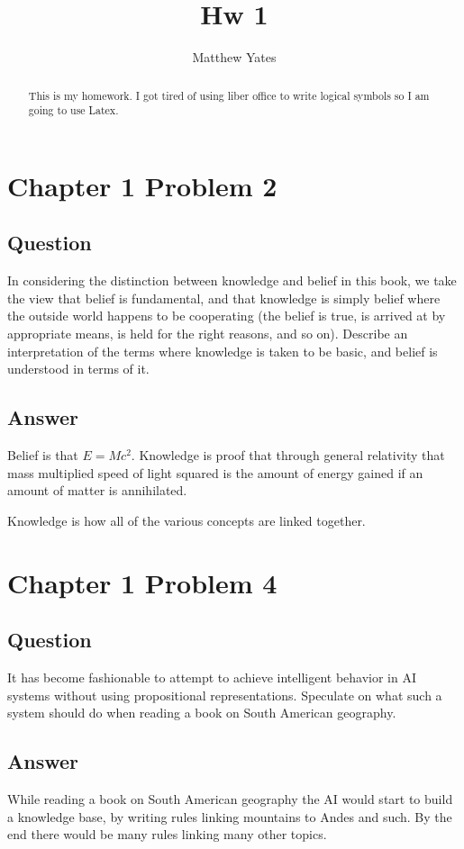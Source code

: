 \documentclass[10pt]{article}
\title{Hw 1}
\author{Matthew Yates}
\begin{document}
\maketitle

\begin{abstract}
	This is my homework. I got tired of using liber office 
	to write logical symbols so I am going to use Latex.
\end{abstract}

\section{Chapter 1 Problem 2}
\subsection{Question}
In considering the distinction between knowledge and belief in this book,
we take the view that belief is fundamental, and that knowledge is simply
belief where the outside world happens to be cooperating (the belief is true,
is arrived at by appropriate means, is held for the right reasons, and so on).
Describe an interpretation of the terms where knowledge is taken to be basic,
and belief is understood in terms of it.

\subsection{Answer}
Belief is that $E=Mc^{2}$. Knowledge is proof that through
general relativity that mass multiplied speed of light 
squared is the amount of energy gained if an amount
of matter is annihilated. 

Knowledge is how all of the various concepts are linked together.

\section{Chapter 1 Problem 4}
\subsection{Question}
It has become fashionable to attempt to achieve intelligent behavior in AI
systems without using propositional representations. Speculate on what such
a system should do when reading a book on South American geography.

\subsection{Answer}
While reading a book on South American geography the AI would start to build
a knowledge base, by writing rules linking mountains to Andes and such.
By the end there would be many rules linking many other topics.
\end{document}
